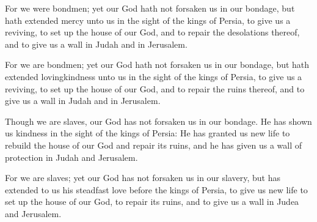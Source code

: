 			For we were bondmen; yet our God hath not forsaken us in our bondage, but hath extended mercy unto us in the sight of the kings of Persia, to give us a reviving, to set up the house of our God, and to repair the desolations thereof, and to give us a wall in Judah and in Jerusalem.

			\begin{versebox}
					\item[BHS] 
					\item[LXX] 
					\item[ASV] For we are bondmen; yet our God hath not forsaken us in our bondage, but hath extended lovingkindness unto us in the sight of the kings of Persia, to give us a reviving, to set up the house of our God, and to repair the ruins thereof, and to give us a wall in Judah and in Jerusalem.
					\item[NIV] Though we are slaves, our God has not forsaken us in our bondage. He has shown us kindness in the sight of the kings of Persia: He has granted us new life to rebuild the house of our God and repair its ruins, and he has given us a wall of protection in Judah and Jerusalem.
					\item[NRSV] For we are slaves; yet our God has not forsaken us in our slavery, but has extended to us his steadfast love before the kings of Persia, to give us new life to set up the house of our God, to repair its ruins, and to give us a wall in Judea and Jerusalem.
			\end{versebox}

